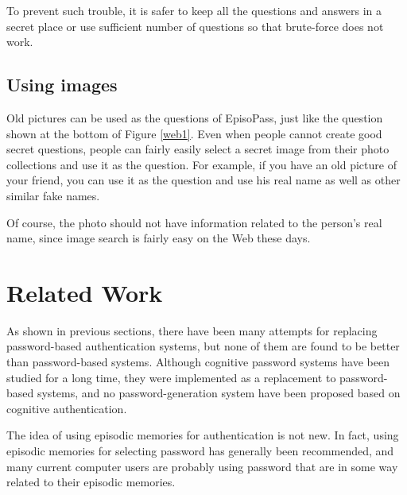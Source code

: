 \documentclass[runningheads,a4paper]{llncs}
\begin{document}
To prevent such trouble, it is safer to keep all the questions and answers
in a secret place or
use sufficient number of questions so that brute-force does not work.

\subsection{Using images}

Old pictures can be used as the questions of EpisoPass,
just like the question shown at the bottom of Figure \ref{web1}.
Even when people cannot create good secret questions,
people can fairly easily select a secret image from their photo collections
and use it as the question.
For example, if you have an old picture of your friend,
you can use it as the question
and use his real name as well as other similar fake names.


Of course, the photo should not have information related to the
person's real name, since image search is fairly easy on the Web these days.

\section{Related Work}


As shown in previous sections,
there have been many attempts for replacing password-based authentication systems,
but none of them are found to be better than
password-based systems\cite{Bonneau:ReplacePasswords}.
%
Although cognitive password systems have been studied for a
long time\cite{Lazar2011}\cite{Zviran:1990:UAC:100512.100538},
they were implemented as a replacement to password-based systems,
and no password-generation system have been proposed
based on cognitive authentication.


The idea of using episodic memories for authentication is not new.
In fact, using episodic memories for selecting password
has generally been recommended,
and many current computer users are probably using password that are
in some way related to their episodic memories.
\end{document}
